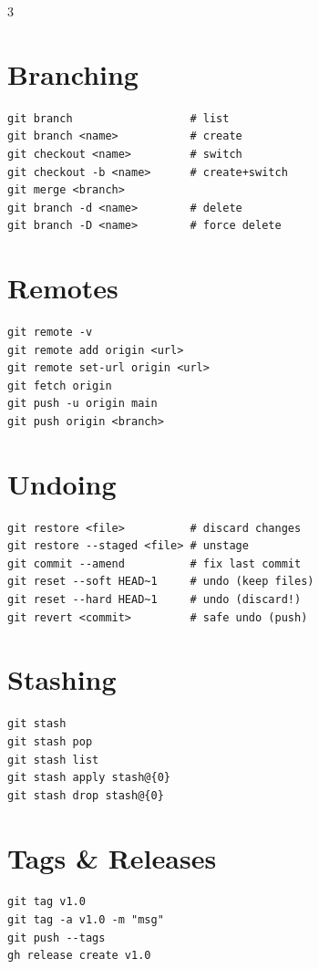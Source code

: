 \documentclass[10pt, a4paper, landscape]{article}
\begin{document}
\begin{multicols}{3}

\section{Branching}
\begin{verbatim}
git branch                  # list
git branch <name>           # create
git checkout <name>         # switch
git checkout -b <name>      # create+switch
git merge <branch>
git branch -d <name>        # delete
git branch -D <name>        # force delete
\end{verbatim}

\section{Remotes}
\begin{verbatim}
git remote -v
git remote add origin <url>
git remote set-url origin <url>
git fetch origin
git push -u origin main
git push origin <branch>
\end{verbatim}

\section{Undoing}
\begin{verbatim}
git restore <file>          # discard changes
git restore --staged <file> # unstage
git commit --amend          # fix last commit
git reset --soft HEAD~1     # undo (keep files)
git reset --hard HEAD~1     # undo (discard!)
git revert <commit>         # safe undo (push)
\end{verbatim}

\section{Stashing}
\begin{verbatim}
git stash
git stash pop
git stash list
git stash apply stash@{0}
git stash drop stash@{0}
\end{verbatim}

\section{Tags \& Releases}
\begin{verbatim}
git tag v1.0
git tag -a v1.0 -m "msg"
git push --tags
gh release create v1.0
\end{verbatim}



\end{multicols}
\end{document}

